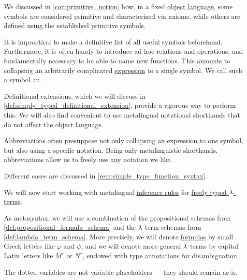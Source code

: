 \begin{concept}\label{con:metalingual_abbreviation}\mimprovised
  We discussed in \cref{con:primitive_notion} how, in a fixed \hyperref[con:metalogic]{object language}, some symbols are considered primitive and characterized via axioms, while others are defined using the established primitive symbols.

  It is impractical to make a definitive list of all useful symbols beforehand. Furthermore, it is often handy to introduce ad-hoc relations and operations, and fundamentally necessary to be able to name new functions. This amounts to collapsing an arbitrarily complicated \hyperref[con:expression]{expression} to a single symbol. We call such a symbol an .

  Definitional extensions, which we will discuss in \cref{def:simply_typed_definitional_extension}, provide a rigorous way to perform this. We will also find convenient to use metalingual notational shorthands that do not affect the object language.
\end{concept}
\begin{comments}
  \item Abbreviations often presuppose not only collapsing an expression to one symbol, but also using a specific notation. Being only metalinguistic shorthands, abbreviations allow us to freely use any notation we like.

  Different cases are discussed in \cref{rem:simple_type_function_syntax}.
\end{comments}

\begin{remark}\label{rem:metalogical_simply_typed_hol_term_placeholders}
  We will now start working with metalingual \hyperref[def:inference_rule]{inference rules} for \hyperref[def:freely_typed_lambda_term]{freely typed \( {\mathrm \lambda} \)-terms}.

  As metasyntax, we will use a combination of the propositional schemas from \cref{def:propositional_formula_schema} and the \( {\mathrm \lambda} \)-term schemas from \cref{def:lambda_term_schema}. More precisely, we will denote \hyperref[def:simply_typed_hol_formula]{formulas} by small Greek letters like \( \varphi \) and \( \psi \), and we will denote more general \( {\mathrm \lambda} \)-terms by capital Latin letters like \( M^\tau \) or \( N^\tau \), endowed with \hyperref[con:type_annotation]{type annotations} for disambiguation.

  The dotted variables are not variable placeholders --- they should remain as-is.
\end{remark}

